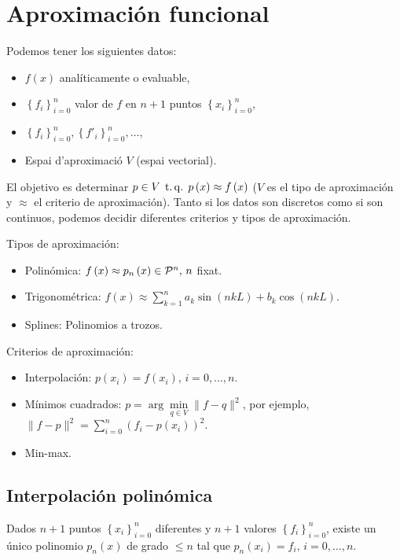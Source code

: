 \chapter{Aproximación funcional}

\noindent Podemos tener los siguientes datos:
\begin{itemize}
    \item $f\left( x \right)$ analíticamente o evaluable,
    \item $\left\{ f_i \right\}^n_{i=0}$ valor de $f$ en $n+1$ puntos $\left\{ x_i \right\}^n_{i=0}$,
    \item $\left\{ f_i \right\}^n_{i=0},\left\{ f'_i \right\}^n_{i=0},\dots$,
    \item Espai d'aproximació $V$ (espai vectorial).
\end{itemize}

\noindent El objetivo es determinar $p\in V\operatorname{\;t.q.\;} p\left( x \right) \approx f\left( x \right)$ ($V$ es el tipo de aproximación y $\approx$ el criterio de aproximación). Tanto si los datos son discretos como si son continuos, podemos decidir diferentes criterios y tipos de aproximación. %

\quad

\noindent Tipos de aproximación:
\begin{itemize}
    \item Polinómica: $f\left( x \right)\approx p_n\left( x \right) \in \mathcal{P}^n,\, n$ fixat.
    \item Trigonométrica: $f\left( x \right)\approx \sum\limits^n_{k=1} a_k \sin\left( nkL \right) + b_k \cos\left( nkL \right)$.
    \item Splines: Polinomios a trozos.
\end{itemize}
Criterios de aproximación:
\begin{itemize}
    \item Interpolación: $p\left( x_i \right) = f\left( x_i \right), \, i=0,\dots,n$.
    \item Mínimos cuadrados: $p = \arg\min\limits_{q\in V} \|f-q\|^2$, por ejemplo, $\|f-p\|^2 = \sum\limits^n_{i=0} \left( f_i -p\left( x_i \right) \right)^2$.
    \item Min-max.
\end{itemize}

\section{Interpolación polinómica}

\begin{teo*}
    Dados $n+1$ puntos $\left\{ x_i \right\}^n_{i=0}$ diferentes y $n+1$ valores $\left\{ f_i \right\}^n_{i=0}$, existe un único polinomio $p_n\left( x \right)$ de grado $\leq n$ tal que $p_n\left( x_i \right) = f_i,\, i=0,\dots,n$.
\end{teo*}


